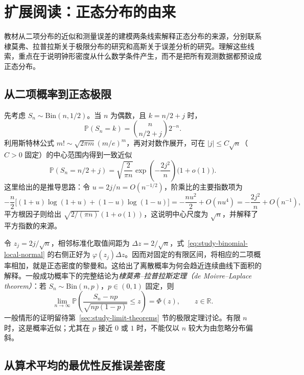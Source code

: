 \section{扩展阅读：正态分布的由来}
\label{sec:study-normal-origin}

教材从二项分布的近似和测量误差的建模两条线索解释正态分布的来源，分别联系棣莫弗、拉普拉斯关于极限分布的研究和高斯关于误差分析的研究。理解这些线索，重点在于说明钟形密度从什么数学条件产生，而不是把所有观测数据都预设成正态分布。

\subsection{从二项概率到正态极限}
\label{subsec:study-normal-binomial-origin}

先考虑 $S_n\sim\mathrm{Bin}(n,1/2)$。当 $n$ 为偶数，且 $k=n/2+j$ 时，
\[
  \mathbb P(S_n=k)=\binom{n}{n/2+j}2^{-n}.
\]
利用斯特林公式 $m!\sim\sqrt{2\pi m}(m/e)^m$，再对对数作展开，可在 $|j|\le C\sqrt n$（$C>0$ 固定）的中心范围内得到一致近似
\begin{equation}
  \mathbb P(S_n=n/2+j)
  =\sqrt{\frac2{\pi n}}\exp\left(-\frac{2j^2}{n}\right)
    \bigl(1+o(1)\bigr).
  \label{eq:study-binomial-local-normal}
\end{equation}
这里给出的是推导思路：令 $u=2j/n=O(n^{-1/2})$，阶乘比的主要指数项为
\[
  -\frac n2\bigl[(1+u)\log(1+u)+(1-u)\log(1-u)\bigr]
  =-\frac{nu^2}{2}+O(nu^4)
  =-\frac{2j^2}{n}+O(n^{-1}),
\]
平方根因子则给出 $\sqrt{2/(\pi n)}(1+o(1))$，这说明中心尺度为 $\sqrt n$，并解释了平方指数的来源。

令 $z_j=2j/\sqrt n$，相邻标准化取值间距为 $\Delta z=2/\sqrt n$，式~\eqref{eq:study-binomial-local-normal} 的右侧正好为 $\varphi(z_j)\Delta z$。因而对固定的有限区间，将相应的二项概率相加，就是正态密度的黎曼和。这给出了离散概率为何会趋近连续曲线下面积的解释。一般成功概率下的完整结论为\emph{棣莫弗--拉普拉斯定理（de Moivre--Laplace theorem）}：若 $S_n\sim\mathrm{Bin}(n,p)$，$p\in(0,1)$ 固定，则
\begin{equation}
  \lim_{n\to\infty}
  \mathbb P\left(\frac{S_n-np}{\sqrt{np(1-p)}}\le z\right)
  =\Phi(z),\qquad z\in\mathbb R.
  \label{eq:study-de-moivre-laplace}
\end{equation}
一般情形的证明留待第~\ref{sec:study-limit-theorems} 节的极限定理讨论。有限 $n$ 时，这是概率近似；尤其在 $p$ 接近 $0$ 或 $1$ 时，不能仅以 $n$ 较大为由忽略分布偏斜。

\subsection{从算术平均的最优性反推误差密度}
\label{subsec:study-normal-error-origin}

